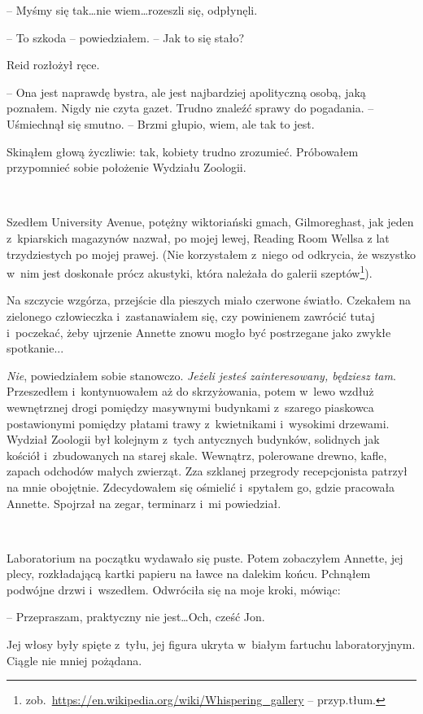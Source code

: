 \documentclass[oneside,polish,11pt,sfheadings]{mwbk}
\begin{document}
-- Myśmy się tak\ldots nie wiem\ldots rozeszli się, odpłynęli.

-- To szkoda -- powiedziałem. -- Jak to się stało?

Reid rozłożył ręce. 

-- Ona jest naprawdę bystra, ale jest najbardziej
apolityczną osobą, jaką poznałem. Nigdy nie czyta gazet. Trudno znaleźć
sprawy do pogadania. -- Uśmiechnął się smutno. -- Brzmi głupio, wiem, ale
tak to jest.

Skinąłem głową życzliwie: tak, kobiety trudno zrozumieć. Próbowałem
przypomnieć sobie położenie Wydziału Zoologii.

~

Szedłem University Avenue, potężny wiktoriański gmach, Gilmoreghast, jak
jeden z~kpiarskich magazynów nazwał, po mojej lewej, Reading Room Wellsa
z lat trzydziestych po mojej prawej. (Nie korzystałem z~niego od
odkrycia, że wszystko w~nim jest doskonałe prócz akustyki, która
należała do galerii szeptów\footnote{zob.~\url{https://en.wikipedia.org/wiki/Whispering_gallery} -- przyp.tłum.}).

Na szczycie wzgórza, przejście dla pieszych miało czerwone światło.
Czekałem na zielonego człowieczka i~zastanawiałem się, czy powinienem
zawrócić tutaj i~poczekać, żeby ujrzenie Annette znowu mogło być
postrzegane jako zwykłe spotkanie...

\emph{Nie}, powiedziałem sobie stanowczo. \emph{Jeżeli jesteś
zainteresowany, będziesz tam}. Przeszedłem i~kontynuowałem aż do
skrzyżowania, potem w~lewo wzdłuż wewnętrznej drogi pomiędzy masywnymi
budynkami z~szarego piaskowca postawionymi pomiędzy płatami trawy z~kwietnikami i~wysokimi drzewami. Wydział Zoologii był kolejnym z~tych
antycznych budynków, solidnych jak kościół i~zbudowanych na starej
skale. Wewnątrz, polerowane drewno, kafle, zapach odchodów małych
zwierząt. Zza szklanej przegrody recepcjonista patrzył na mnie
obojętnie. Zdecydowałem się ośmielić i~spytałem go, gdzie pracowała
Annette. Spojrzał na zegar, terminarz i~mi powiedział.

~

Laboratorium na początku wydawało się puste. Potem zobaczyłem Annette,
jej plecy, rozkładającą kartki papieru na ławce na dalekim końcu.
Pchnąłem podwójne drzwi i~wszedłem. Odwróciła się na moje kroki, mówiąc:

-- Przepraszam, praktyczny nie jest\ldots Och, cześć Jon.

Jej włosy były spięte z~tyłu, jej figura ukryta w~białym fartuchu
laboratoryjnym. Ciągle nie mniej pożądana.
\end{document}
